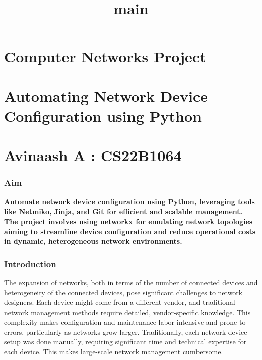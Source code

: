 \documentclass[11pt]{article}
\title{main}
\begin{document}
    
    \maketitle
    
    

    
    \hypertarget{computer-networks-project}{%
\section{Computer Networks Project}\label{computer-networks-project}}

\hypertarget{automating-network-device-configuration-using-python}{%
\section{Automating Network Device Configuration using
Python}\label{automating-network-device-configuration-using-python}}

\hypertarget{avinaash-a-cs22b1064}{%
\section{Avinaash A : CS22B1064}\label{avinaash-a-cs22b1064}}

    \hypertarget{aim}{%
\subsubsection{Aim}\label{aim}}

\textbf{Automate network device configuration using Python, leveraging
tools like Netmiko, Jinja, and Git for efficient and scalable
management. The project involves using networkx for emulating network
topologies aiming to streamline device configuration and reduce
operational costs in dynamic, heterogeneous network environments.}

    

    \hypertarget{introduction}{%
\subsubsection{Introduction}\label{introduction}}

The expansion of networks, both in terms of the number of connected
devices and heterogeneity of the connected devices, pose significant
challenges to network designers. Each device might come from a different
vendor, and traditional network management methods require detailed,
vendor-specific knowledge. This complexity makes configuration and
maintenance labor-intensive and prone to errors, particularly as
networks grow larger. Traditionally, each network device setup was done
manually, requiring significant time and technical expertise for each
device. This makes large-scale network management cumbersome.
\end{document}

